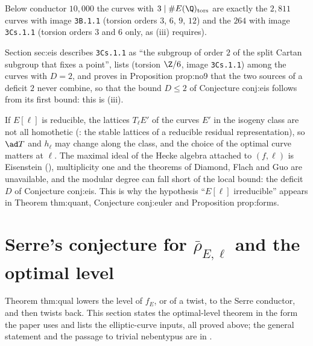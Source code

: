 Below conductor $10{,}000$ the curves with $3\mid\#E(\Q)_{\mathrm{tors}}$ are exactly the $2{,}811$ curves with image \texttt{3B.1.1} (torsion orders $3$, $6$, $9$, $12$)
and the $264$ with image \texttt{3Cs.1.1} (torsion orders $3$ and $6$ only, as (iii) requires).

\begin{paperlink}
Section sec:eis describes \texttt{3Cs.1.1} as ``the subgroup of order $2$ of the split Cartan subgroup that fixes a
point'', lists  (torsion $\Z/6$, image \texttt{3Cs.1.1}) among the curves with $D=2$, and proves in Proposition prop:no9 that the two sources of a
deficit $2$ never combine, so that the bound $D\le2$ of Conjecture conj:eis follows from its first bound: this is (iii).
\end{paperlink}

\begin{remark}\label{rem:galrep:eisenstein}
If $E[\ell]$ is reducible, the lattices $T_\ell E'$ of the curves $E'$ in the isogeny class are not all homothetic (: the stable lattices of a
reducible residual representation), so $\ad T$ and $h_\ell$ may change along the class, and the choice of the optimal curve matters at $\ell$. The
maximal ideal of the Hecke algebra attached to $(f,\ell)$ is Eisenstein (), multiplicity one and the theorems of Diamond, Flach and
Guo are unavailable, and the modular degree can fall short of the local bound: the deficit $D$ of Conjecture conj:eis. This is why the
hypothesis ``$E[\ell]$ irreducible'' appears in Theorem thm:quant, Conjecture conj:euler and Proposition prop:forms.
\end{remark}

\section[Serre's conjecture and the optimal level]{Serre's conjecture for \texorpdfstring{$\bar\rho_{E,\ell}$}{rhobar} and the optimal level}\label{sec:galrep:serre}

Theorem thm:qual lowers the level of $f_E$, or of a twist, to the Serre conductor, and then twists back. This section states the optimal-level
theorem in the form the paper uses and lists the elliptic-curve inputs, all proved above; the general statement and the passage to trivial
nebentypus are in .

